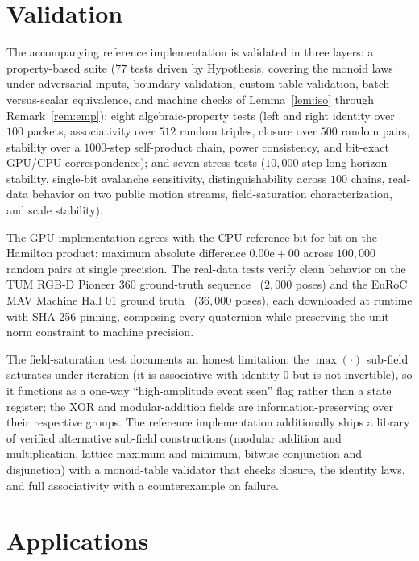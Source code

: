 \documentclass[11pt]{article}
\begin{document}
\section{Validation}

The accompanying reference implementation is validated in three layers: a
property-based suite ($77$ tests driven by Hypothesis, covering the monoid
laws under adversarial inputs, boundary validation, custom-table
validation, batch-versus-scalar equivalence, and machine checks of
Lemma~\ref{lem:iso} through Remark~\ref{rem:emp}); eight algebraic-property
tests (left and right identity over $100$ packets, associativity over $512$
random triples, closure over $500$ random pairs, stability over a
$1000$-step self-product chain, power consistency, and bit-exact GPU/CPU
correspondence); and seven stress tests ($10{,}000$-step long-horizon
stability, single-bit avalanche sensitivity, distinguishability across
$100$ chains, real-data behavior on two public motion streams,
field-saturation characterization, and scale stability).

The GPU implementation agrees with the CPU reference bit-for-bit on the Hamilton
product: maximum absolute difference $0.00\mathrm{e}{+}00$ across $100{,}000$
random pairs at single precision. The real-data tests verify clean behavior on
the TUM RGB-D Pioneer 360 ground-truth sequence~\cite{Sturm2012} ($2{,}000$
poses) and the EuRoC MAV Machine Hall 01 ground truth~\cite{Burri2016}
($36{,}000$ poses), each downloaded at runtime with SHA-256 pinning, composing
every quaternion while preserving the unit-norm constraint to machine
precision.

The field-saturation test documents an honest limitation: the $\max(\cdot)$
sub-field saturates under iteration (it is associative with identity $0$ but is
not invertible), so it functions as a one-way ``high-amplitude event seen''
flag rather than a state register; the XOR and modular-addition fields are
information-preserving over their respective groups. The reference
implementation additionally ships a library of verified alternative
sub-field constructions (modular addition and multiplication, lattice
maximum and minimum, bitwise conjunction and disjunction) with a
monoid-table validator that checks closure, the identity laws, and full
associativity with a counterexample on failure.

\section{Applications}
\end{document}
